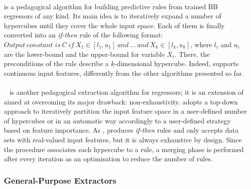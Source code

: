 \documentclass[12pt,a4paper,openright,twoside]{book}
\begin{document}
\paragraph{\iter}\label{par:iter}

\iter{} \cite{HuysmansBV2006} is a pedagogical algorithm for building predictive rules from trained BB regressors of any kind.
%
Its main idea is to iteratively expand a number of hypercubes until they cover the whole input space.
%
Each of them is finally converted into an \emph{if-then} rule of the following format:
$\textit{Output} ~ \textit{constant is} ~ C ~ \textit{if} ~ X_1 \in [l_1, \mathit{u_1}]
~\textit{and} ~ ... ~ \textit{and} ~ \mathit{X_k} \in [\mathit{l_k}, \mathit{u_k}]$,
%
where $l_i$ and $u_i$ are the lower-bound and the upper-bound for variable $X_i$.
%
There, the preconditions of the rule describe a $k$-dimensional hypercube.
%
Indeed, \iter{} supports continuous input features, differently from the other algorithms presented so far.

\paragraph{\gridex}\label{par:gridex}

\gridex~\cite{gridex-extraamas2021} is another pedagogical extraction algorithm for regressors; it is an extension of \iter{} aimed at overcoming its major drawback: non-exhaustivity.
%
\gridex{} adopts a top-down approach to iteratively partition the input feature space in a user-defined number of hypercubes or in an automatic way accordingly to a user-defined strategy based on feature importance.
%
As \iter{}, \gridex{} produces \emph{if-then} rules and only accepts data sets with real-valued input features, but it is always exhaustive by design.
%
Since the procedure associates each hypercube to a rule, a merging phase is performed after every iteration as an optimisation to reduce the number of rules.

\subsubsection{General-Purpose Extractors}\label{ssec:generalpurpose}

\paragraph{\cart}\label{par:cart}
\end{document}
